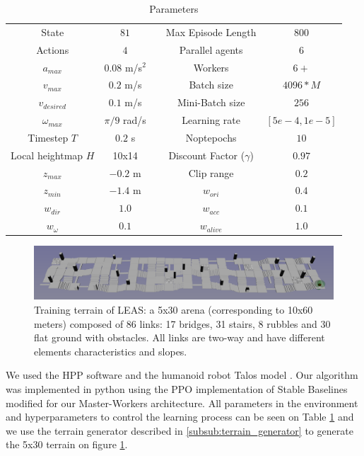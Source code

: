 \begin{table}[tb]
\begin{center}
\caption{Parameters}
\begin{tabular}{|c|c| c |c|c|}
 State & $81$ && Max Episode Length & $800$\\
 Actions & $4$ && Parallel agents & $6$\\
 $a_{max}$ & $0.08$ m/s$^2$ && Workers & $6+$\\
 $v_{max}$ & $0.2$ m/s && Batch size & $4096*M$\\
 $v_{desired}$ & $0.1$ m/s && Mini-Batch size & $256$\\
 $\omega_{max}$ & $\pi/9$ rad/s && Learning rate & $[5e-4,1e-5]$\\
 Timestep $T$ & $0.2$ s && Noptepochs & $10$\\
 Local heightmap $H$ & 10x14 && Discount Factor ($\gamma$) & $0.97$\\
 $z_{max}$ & $-0.2$ m  && Clip range & $0.2$\\
 $z_{min}$ & $-1.4$ m &&
 $w_{ori}$ & $0.4$ \\
 $w_{dir}$ & $1.0$  &&
 $w_{acc}$ & $0.1$ \\
 $w_{\omega}$ & $0.1$  &&
 $w_{alive}$ & $1.0$
\end{tabular}
\label{tab:param}
\end{center}
\end{table}

\begin{figure}
    \centering
    \includegraphics[width=\textwidth]{Figures/Chapter_LEAS/arena_5x30.png}
    \caption{Training terrain of LEAS: a 5x30 arena (corresponding to 10x60 meters) composed of 86 links: 17 bridges, 31 stairs, 8 rubbles and 30 flat ground with obstacles. All links are two-way and have different elements characteristics and slopes.}
    \label{fig:arena_5x30}
\end{figure}

We used the HPP software \cite{HPP_software} and the humanoid robot Talos model \cite{talos_robot}. Our algorithm was implemented in python using the PPO implementation of Stable Baselines \cite{stable-baselines} modified for our Master-Workers architecture.
All parameters in the environment and hyperparameters to control the learning process can be seen on Table \ref{tab:param} and we use the terrain generator described in \ref{subsub:terrain_generator} to generate the 5x30 terrain on figure \ref{fig:arena_5x30}.

